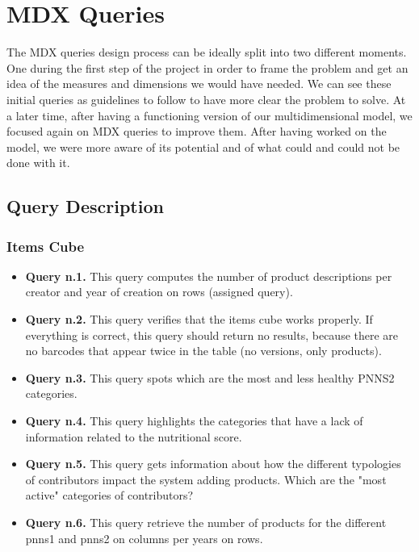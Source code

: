 \documentclass[runningheads]{llncs}
\begin{document}
\section{MDX Queries}\label{queries}
The MDX queries design process can be ideally split into two different moments. One during the first step of the project in order to frame the problem and get an idea of the measures and dimensions we would have needed. We can see these initial queries as guidelines to follow to have more clear the problem to solve. At a later time, after having a functioning version of our multidimensional model, we focused again on MDX queries to improve them. After having worked on the model, we were more aware of its potential and of what could and could not be done with it.

\subsection{Query Description}
\subsubsection{Items Cube}
\begin{itemize}\label{itemsQueries}
  \item \textbf{Query n.1.} This query computes the number of product descriptions per creator and year of creation on rows (assigned query).
  \item \textbf{Query n.2.} This query verifies that the items cube works properly. If everything is correct, this query should return no results, because there are no barcodes that appear twice in the table (no versions, only products).
  \item \textbf{Query n.3.} This query spots which are the most and less healthy PNNS2 categories.
  \item \textbf{Query n.4.} This query highlights the categories that have a lack of information related to the nutritional score.
  \item \textbf{Query n.5.} This query gets information about how the different typologies of contributors impact the system adding products. Which are the "most active" categories of contributors?
  \item \textbf{Query n.6.} This query retrieve the number of products for the different pnns1 and pnns2 on columns per years on rows. 
\end{itemize}
\end{document}
